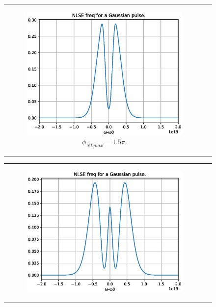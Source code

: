 \begin{figure}[label={fig:spmssfm}, caption={Shape of the spectra for Gaussian pulses by maximum phase shift ($\phi_{NL}$).}]
\begin{tabular}[c]{cc}
        \hfill
        \begin{subfigure}[b]{.53\textwidth}
		    \centering	
            \includegraphics[width=1\linewidth]{figures/chap3/ssfm_spm/1_5pi.eps}
            \caption{$\phi_{NLmax}= 1.5\pi$.}
            \label{fig:spm15pi}
        \end{subfigure}
        \end{tabular}
        \begin{tabular}[c]{cc}
        \centering	
        \begin{subfigure}[b]{.53\textwidth}
		    \centering	
            \includegraphics[width=1\linewidth]{figures/chap3/ssfm_spm/2_5pi.eps}

\end{subfigure}
\end{tabular}
\end{figure}
